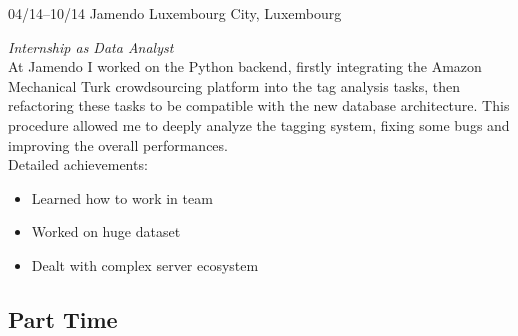 \documentclass[]{friggeri-cv} %
\begin{document}
\begin{entrylist}
\entry
{04/14--10/14}
{Jamendo}
{Luxembourg City, Luxembourg}
{\emph{Internship as Data Analyst} \\
At Jamendo I worked on the Python backend, firstly integrating the Amazon Mechanical Turk crowdsourcing platform into the tag analysis tasks, then refactoring these tasks to be compatible with the new database architecture. This procedure allowed me to deeply analyze the tagging system, fixing some bugs and improving the overall performances. \\
Detailed achievements:
\begin{itemize}
  \item Learned how to work in team
  \item Worked on huge dataset
  \item Dealt with complex server ecosystem
\end{itemize}}


\end{entrylist}

\subsection{Part Time}
\end{document}

